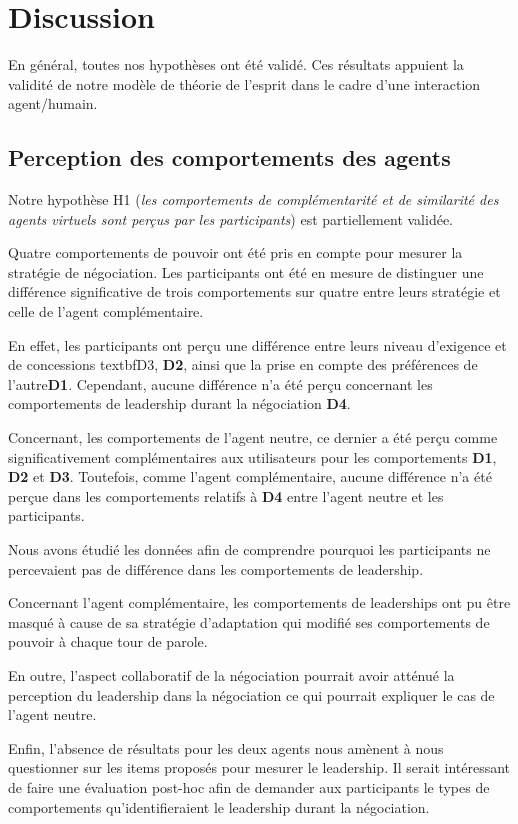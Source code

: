\section{Discussion}
\label{sec:discussion}
En général, toutes nos hypothèses ont été validé. Ces résultats appuient la validité de notre modèle de théorie de l'esprit dans le cadre d'une interaction agent/humain.   

\subsection{Perception des comportements des agents}
Notre hypothèse H1 (\textit{les comportements de complémentarité et de similarité des agents virtuels sont perçus par les participants}) est partiellement validée. 

Quatre comportements de pouvoir ont été pris en compte pour mesurer la stratégie de négociation. 
Les participants ont été en mesure de distinguer une différence significative de trois comportements sur quatre entre leurs stratégie et celle de l'agent complémentaire.

En effet, les participants ont perçu une différence entre leurs niveau d'exigence et de concessions textbf{D3}, \textbf{D2}, ainsi que la prise en compte des préférences de l'autre\textbf{D1}. Cependant, aucune différence n'a été perçu concernant les comportements de leadership durant la négociation \textbf{D4}. 

Concernant, les comportements de l'agent neutre, ce dernier a été perçu comme significativement complémentaires aux utilisateurs pour les comportements \textbf{D1}, \textbf{D2} et \textbf{D3}. 
Toutefois, comme l'agent complémentaire, aucune différence n'a été perçue dans les comportements relatifs à \textbf{D4} entre l'agent neutre et les participants. 

Nous avons étudié les données afin de comprendre pourquoi les participants ne percevaient pas de différence dans les comportements de leadership. 

Concernant l'agent complémentaire, les comportements de leaderships ont pu être masqué à cause de  sa stratégie d'adaptation qui modifié ses comportements de pouvoir à chaque tour de parole.

En outre, l'aspect collaboratif de la négociation pourrait avoir atténué la perception du leadership dans la négociation ce qui pourrait expliquer le cas de l'agent neutre. 
  
Enfin, l'absence de résultats pour les deux agents nous amènent à nous questionner sur les items proposés pour mesurer le leadership. 
 Il serait intéressant de faire une évaluation post-hoc afin de demander aux participants le types de comportements qu'identifieraient le leadership durant la négociation.

